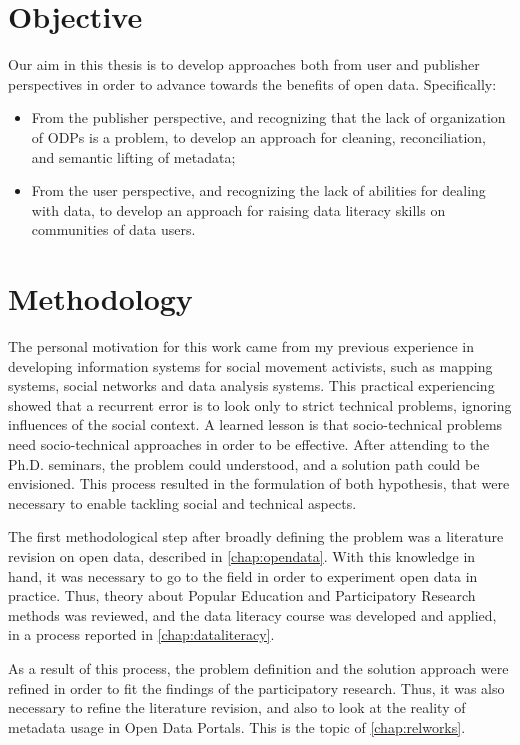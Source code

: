 \section{Objective}

Our aim in this thesis is to develop approaches both from user and publisher perspectives in order to advance towards the benefits of open data. Specifically:
\begin{itemize}
	\item From the publisher perspective, and recognizing that the lack of organization of ODPs is a problem, to develop an approach for cleaning, reconciliation, and semantic lifting of metadata;
	\item From the user perspective, and recognizing the lack of abilities for dealing with data, to develop an approach for raising data literacy skills on communities of data users.
\end{itemize}

\section{Methodology}

The personal motivation for this work came from my previous experience in developing information systems for social movement activists, such as mapping systems, social networks and data analysis systems.
This practical experiencing showed that a recurrent error is to look only to strict technical problems, ignoring influences of the social context.
A learned lesson is that socio-technical problems need socio-technical approaches in order to be effective.
After attending to the Ph.D. seminars, the problem could understood, and a solution path could be envisioned.
This process resulted in the formulation of both hypothesis, that were necessary to enable tackling social and technical aspects.

The first methodological step after broadly defining the problem was a literature revision on open data, described in \autoref{chap:opendata}.
With this knowledge in hand, it was necessary to go to the field in order to experiment open data in practice.
Thus, theory about Popular Education and Participatory Research methods was reviewed, and the data literacy course was developed and applied, in a process reported in \autoref{chap:dataliteracy}.

As a result of this process, the problem definition and the solution approach were refined in order to fit the findings of the participatory research.
Thus, it was also necessary to refine the literature revision, and also to look at the reality of metadata usage in Open Data Portals.
This is the topic of \autoref{chap:relworks}.

